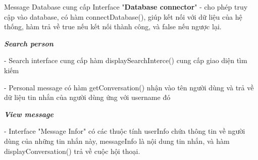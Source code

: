 \documentclass[a4paper]{article}
\begin{document}
\begin{itemize}
\begin{minipage}[b]{0.4\textwidth}
Message Database cung cấp Interface "\textbf{Database connector}" - cho phép truy cập vào database, có hàm connectDatabase(), giúp kết nối với dữ liệu của hệ thống, hàm trả về true nếu kết nối thành công, và false nếu ngược lại.
\end{minipage}
\hfill
{}
\newline
\newline
\textbf{\textit{Search person} }\\
\begin{minipage}[b]{0.4\textwidth}
- Search interface cung cấp hàm displaySearchInterce() cung cấp giao diện tìm kiếm
\end{minipage}
\hfill
{}
\newline
\begin{minipage}[b]{0.4\textwidth}
- Personal message có hàm getConversation() nhận vào tên người dùng và trả về dữ liệu tin nhắn của người dùng 	ứng với username đó
\end{minipage}
\hfill
{}
\newline
\textbf{\textit{View message }} \\
\begin{minipage}[b]{0.4\textwidth}
- Interface "Message Infor" có các thuộc tính userInfo chứa thông tin về người dùng của những tin nhắn này, messageInfo là nội dung tin nhắn, và hàm displayConversation() trả về cuộc hội thoại.

\end{minipage}
\end{itemize}
\end{document}
